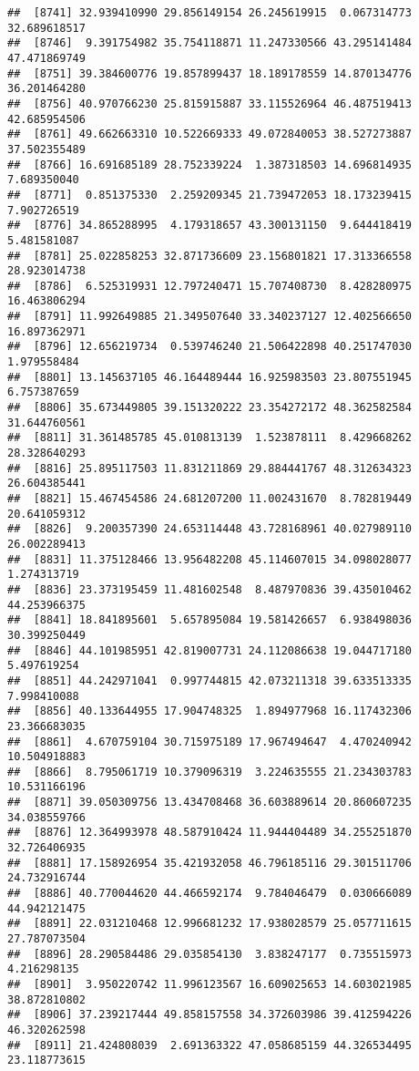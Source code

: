 \documentclass[
]{article}
\begin{document}
\begin{verbatim}
##  [8741] 32.939410990 29.856149154 26.245619915  0.067314773 32.689618517
##  [8746]  9.391754982 35.754118871 11.247330566 43.295141484 47.471869749
##  [8751] 39.384600776 19.857899437 18.189178559 14.870134776 36.201464280
##  [8756] 40.970766230 25.815915887 33.115526964 46.487519413 42.685954506
##  [8761] 49.662663310 10.522669333 49.072840053 38.527273887 37.502355489
##  [8766] 16.691685189 28.752339224  1.387318503 14.696814935  7.689350040
##  [8771]  0.851375330  2.259209345 21.739472053 18.173239415  7.902726519
##  [8776] 34.865288995  4.179318657 43.300131150  9.644418419  5.481581087
##  [8781] 25.022858253 32.871736609 23.156801821 17.313366558 28.923014738
##  [8786]  6.525319931 12.797240471 15.707408730  8.428280975 16.463806294
##  [8791] 11.992649885 21.349507640 33.340237127 12.402566650 16.897362971
##  [8796] 12.656219734  0.539746240 21.506422898 40.251747030  1.979558484
##  [8801] 13.145637105 46.164489444 16.925983503 23.807551945  6.757387659
##  [8806] 35.673449805 39.151320222 23.354272172 48.362582584 31.644760561
##  [8811] 31.361485785 45.010813139  1.523878111  8.429668262 28.328640293
##  [8816] 25.895117503 11.831211869 29.884441767 48.312634323 26.604385441
##  [8821] 15.467454586 24.681207200 11.002431670  8.782819449 20.641059312
##  [8826]  9.200357390 24.653114448 43.728168961 40.027989110 26.002289413
##  [8831] 11.375128466 13.956482208 45.114607015 34.098028077  1.274313719
##  [8836] 23.373195459 11.481602548  8.487970836 39.435010462 44.253966375
##  [8841] 18.841895601  5.657895084 19.581426657  6.938498036 30.399250449
##  [8846] 44.101985951 42.819007731 24.112086638 19.044717180  5.497619254
##  [8851] 44.242971041  0.997744815 42.073211318 39.633513335  7.998410088
##  [8856] 40.133644955 17.904748325  1.894977968 16.117432306 23.366683035
##  [8861]  4.670759104 30.715975189 17.967494647  4.470240942 10.504918883
##  [8866]  8.795061719 10.379096319  3.224635555 21.234303783 10.531166196
##  [8871] 39.050309756 13.434708468 36.603889614 20.860607235 34.038559766
##  [8876] 12.364993978 48.587910424 11.944404489 34.255251870 32.726406935
##  [8881] 17.158926954 35.421932058 46.796185116 29.301511706 24.732916744
##  [8886] 40.770044620 44.466592174  9.784046479  0.030666089 44.942121475
##  [8891] 22.031210468 12.996681232 17.938028579 25.057711615 27.787073504
##  [8896] 28.290584486 29.035854130  3.838247177  0.735515973  4.216298135
##  [8901]  3.950220742 11.996123567 16.609025653 14.603021985 38.872810802
##  [8906] 37.239217444 49.858157558 34.372603986 39.412594226 46.320262598
##  [8911] 21.424808039  2.691363322 47.058685159 44.326534495 23.118773615

\end{verbatim}
\end{document}
